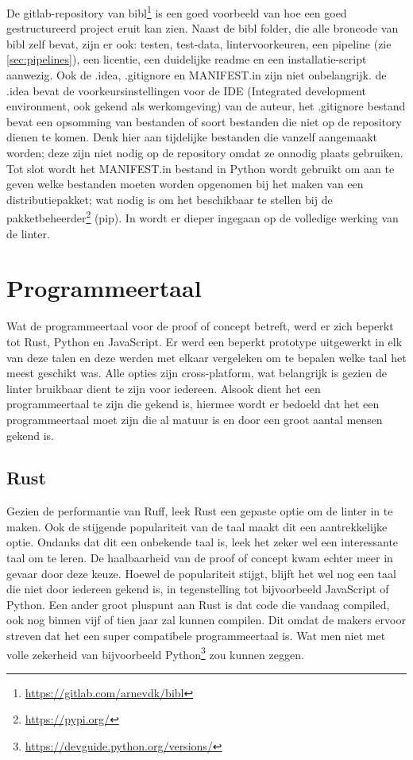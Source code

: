 De gitlab-repository van bibl\footnote{\url{https://gitlab.com/arnevdk/bibl}} is een goed voorbeeld van hoe een goed gestructureerd project eruit kan zien. Naast de bibl folder, die alle broncode van bibl zelf bevat, zijn er ook: testen, test-data, lintervoorkeuren, een pipeline (zie \ref{sec:pipelines}), een licentie, een duidelijke readme en een installatie-script aanwezig. Ook de .idea, .gitignore en MANIFEST.in zijn niet onbelangrijk. de .idea bevat de voorkeursinstellingen voor de IDE (Integrated development environment, ook gekend als werkomgeving) van de auteur, het .gitignore bestand bevat een opsomming van bestanden of soort bestanden die niet op de repository dienen te komen. Denk hier aan tijdelijke bestanden die vanzelf aangemaakt worden; deze zijn niet nodig op de repository omdat ze onnodig plaats gebruiken. Tot slot wordt het MANIFEST.in bestand in Python wordt gebruikt om aan te geven welke bestanden moeten worden opgenomen bij het maken van een distributiepakket; wat nodig is om het beschikbaar te stellen bij de pakketbeheerder\footnote{\url{https://pypi.org/}} (pip). In  wordt er dieper ingegaan op de volledige werking van de linter.

\section{Programmeertaal}
Wat de programmeertaal voor de proof of concept betreft, werd er zich beperkt tot Rust, Python en JavaScript. Er werd een beperkt prototype uitgewerkt in elk van deze talen en deze werden met elkaar vergeleken om te bepalen welke taal het meest geschikt was. Alle opties zijn cross-platform, wat belangrijk is gezien de linter bruikbaar dient te zijn voor iedereen. Alsook dient het een programmeertaal te zijn die gekend is, hiermee wordt er bedoeld dat het een programmeertaal moet zijn die al matuur is en door een groot aantal mensen gekend is.

\subsection{Rust}
Gezien de performantie van Ruff, leek Rust een gepaste optie om de linter in te maken. Ook de stijgende populariteit van de taal maakt dit een aantrekkelijke optie. Ondanks dat dit een onbekende taal is, leek het zeker wel een interessante taal om te leren. De haalbaarheid van de proof of concept kwam echter meer in gevaar door deze keuze. Hoewel de populariteit stijgt, blijft het wel nog een taal die niet door iedereen gekend is, in tegenstelling tot bijvoorbeeld JavaScript of Python. Een ander groot pluspunt aan Rust is dat code die vandaag compiled, ook nog binnen vijf of tien jaar zal kunnen compilen. Dit omdat de makers ervoor streven dat het een super compatibele programmeertaal is. Wat men niet met volle zekerheid van bijvoorbeeld Python\footnote{\url{https://devguide.python.org/versions/}} zou kunnen zeggen. 
 
